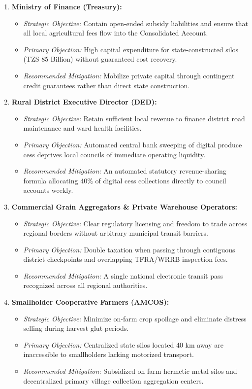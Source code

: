 \documentclass[11pt, a4paper]{report}
\begin{document}
\begin{enumerate}
    \item \textbf{Ministry of Finance (Treasury):}
    \begin{itemize}[label=-]
        \item \textit{Strategic Objective:} Contain open-ended subsidy liabilities and ensure that all local agricultural fees flow into the Consolidated Account.
        \item \textit{Primary Objection:} High capital expenditure for state-constructed silos (TZS 85 Billion) without guaranteed cost recovery.
        \item \textit{Recommended Mitigation:} Mobilize private capital through contingent credit guarantees rather than direct state construction.
    \end{itemize}
    \item \textbf{Rural District Executive Director (DED):}
    \begin{itemize}[label=-]
        \item \textit{Strategic Objective:} Retain sufficient local revenue to finance district road maintenance and ward health facilities.
        \item \textit{Primary Objection:} Automated central bank sweeping of digital produce cess deprives local councils of immediate operating liquidity.
        \item \textit{Recommended Mitigation:} An automated statutory revenue-sharing formula allocating 40\% of digital cess collections directly to council accounts weekly.
    \end{itemize}
    \item \textbf{Commercial Grain Aggregators \& Private Warehouse Operators:}
    \begin{itemize}[label=-]
        \item \textit{Strategic Objective:} Clear regulatory licensing and freedom to trade across regional borders without arbitrary municipal transit barriers.
        \item \textit{Primary Objection:} Double taxation when passing through contiguous district checkpoints and overlapping TFRA/WRRB inspection fees.
        \item \textit{Recommended Mitigation:} A single national electronic transit pass recognized across all regional authorities.
    \end{itemize}
    \item \textbf{Smallholder Cooperative Farmers (AMCOS):}
    \begin{itemize}[label=-]
        \item \textit{Strategic Objective:} Minimize on-farm crop spoilage and eliminate distress selling during harvest glut periods.
        \item \textit{Primary Objection:} Centralized state silos located 40 km away are inaccessible to smallholders lacking motorized transport.
        \item \textit{Recommended Mitigation:} Subsidized on-farm hermetic metal silos and decentralized primary village collection aggregation centers.
    \end{itemize}
\end{enumerate}
\end{document}
